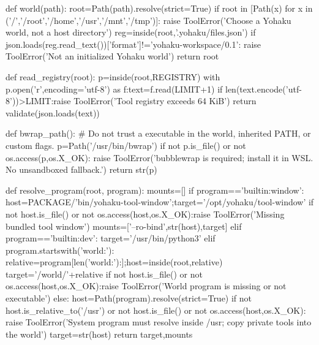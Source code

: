 def world(path):
    root=Path(path).resolve(strict=True)
    if root in [Path(x) for x in ('/','/root','/home','/usr','/mnt','/tmp')]:
        raise ToolError('Choose a Yohaku world, not a host directory')
    reg=inside(root,'.yohaku/files.json')
    if json.loads(reg.read_text())['format']!='yohaku-workspace/0.1':
        raise ToolError('Not an initialized Yohaku world')
    return root

def read_registry(root):
    p=inside(root,REGISTRY)
    with p.open('r',encoding='utf-8') as f:text=f.read(LIMIT+1)
    if len(text.encode('utf-8'))>LIMIT:raise ToolError('Tool registry exceeds 64 KiB')
    return validate(json.loads(text))

def bwrap_path():
    # Do not trust a executable in the world, inherited PATH, or custom flags.
    p=Path('/usr/bin/bwrap')
    if not p.is_file() or not os.access(p,os.X_OK):
        raise ToolError('bubblewrap is required; install it in WSL. No unsandboxed fallback.')
    return str(p)

def resolve_program(root, program):
    mounts=[]
    if program=='builtin:window':
        host=PACKAGE/'bin/yohaku-tool-window';target='/opt/yohaku/tool-window'
        if not host.is_file() or not os.access(host,os.X_OK):raise ToolError('Missing bundled tool window')
        mounts=['--ro-bind',str(host),target]
    elif program=='builtin:dev':
        target='/usr/bin/python3'
    elif program.startswith('world:'):
        relative=program[len('world:'):];host=inside(root,relative)
        target='/world/'+relative
        if not host.is_file() or not os.access(host,os.X_OK):raise ToolError('World program is missing or not executable')
    else:
        host=Path(program).resolve(strict=True)
        if not host.is_relative_to('/usr') or not host.is_file() or not os.access(host,os.X_OK):
            raise ToolError('System program must resolve inside /usr; copy private tools into the world')
        target=str(host)
    return target,mounts

